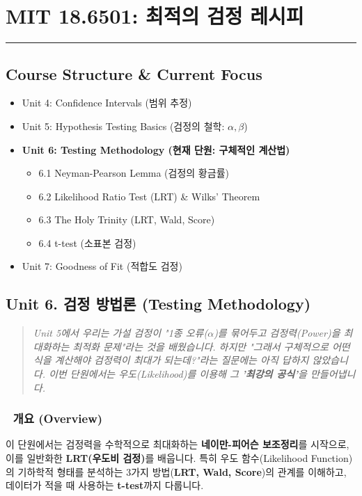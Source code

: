 \documentclass[11pt,a4paper]{book}
\theoremstyle{definition}
\begin{document}
\chapter{MIT 18.6501: 최적의 검정 레시피}
\label{ch:lecture6}


\vspace{1cm}
\hrule
\vspace{1cm}

\section*{Course Structure \& Current Focus}
\begin{itemize}
    \item Unit 4: Confidence Intervals (범위 추정)
    \item Unit 5: Hypothesis Testing Basics (검정의 철학: $\alpha, \beta$)
    \item \textbf{\textcolor{mainblue}{Unit 6: Testing Methodology (현재 단원: 구체적인 계산법)}}
    \begin{itemize}
        \item 6.1 Neyman-Pearson Lemma (검정의 황금률)
        \item 6.2 Likelihood Ratio Test (LRT) \& Wilks' Theorem
        \item 6.3 The Holy Trinity (LRT, Wald, Score)
        \item 6.4 t-test (소표본 검정)
    \end{itemize}
    \item Unit 7: Goodness of Fit (적합도 검정)
\end{itemize}


\section{Unit 6. 검정 방법론 (Testing Methodology)}

\begin{quote}
\textit{Unit 5에서 우리는 가설 검정이 "1종 오류($\alpha$)를 묶어두고 검정력(Power)을 최대화하는 최적화 문제"라는 것을 배웠습니다. 하지만 "그래서 구체적으로 어떤 식을 계산해야 검정력이 최대가 되는데?"라는 질문에는 아직 답하지 않았습니다. 이번 단원에서는 우도(Likelihood)를 이용해 그 \textbf{'최강의 공식'}을 만들어냅니다.}
\end{quote}

\subsection*{📌 개요 (Overview)}
이 단원에서는 검정력을 수학적으로 최대화하는 \textbf{네이만-피어슨 보조정리}를 시작으로, 이를 일반화한 \textbf{LRT(우도비 검정)}를 배웁니다. 특히 우도 함수(Likelihood Function)의 기하학적 형태를 분석하는 3가지 방법(\textbf{LRT, Wald, Score})의 관계를 이해하고, 데이터가 적을 때 사용하는 \textbf{t-test}까지 다룹니다.
\end{document}
